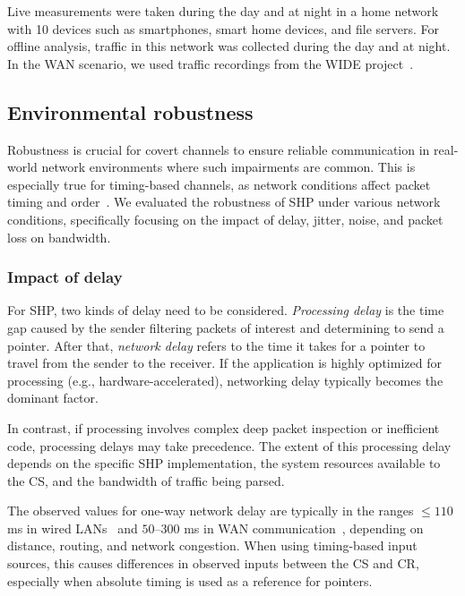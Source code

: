 \documentclass[journal]{IEEEtran}
\begin{document}
Live measurements were taken during the day and at night in a home network with 10 devices such as smartphones, smart home devices, and file servers. For offline analysis, traffic in this network was collected during the day and at night. In the WAN scenario, we used traffic recordings from the WIDE project~\cite{WIDE}.

\subsection{Environmental robustness}
\label{sec:robustness}

Robustness is crucial for covert channels to ensure reliable communication in real-world network environments where such impairments are common. This is especially true for timing-based channels, as network conditions affect packet timing and order~\cite{wendzelpatternsurvey15}. We evaluated the robustness of \ac{SHP} under various network conditions, specifically focusing on the impact of delay, jitter, noise, and packet loss on bandwidth.

\subsubsection{Impact of delay}

For \ac{SHP}, two kinds of delay need to be considered. \textit{Processing delay} is the time gap caused by the sender filtering packets of interest and determining to send a pointer. After that, \textit{network delay} refers to the time it takes for a pointer to travel from the sender to the receiver. If the application is highly optimized for processing (e.g., hardware-accelerated), networking delay typically becomes the dominant factor. 

In contrast, if processing involves complex deep packet inspection or inefficient code, processing delays may take precedence. The extent of this processing delay depends on the specific \ac{SHP} implementation, the system resources available to the \ac{CS}, and the bandwidth of traffic being parsed.

The observed values for one-way network delay are typically in the ranges $\leq 110$ ms in wired LANs~\cite{delay14} and $50$--$300$ ms in WAN communication~\cite{delay12}, depending on distance, routing, and network congestion. When using timing-based input sources, this causes differences in observed inputs between the \ac{CS} and \ac{CR}, especially when absolute timing is used as a reference for pointers. 
\end{document}
